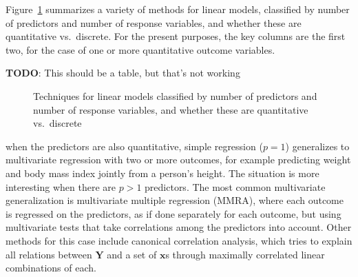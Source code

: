 \documentclass[
  letterpaper,
  10pt,
  krantz2]{krantz}
\begin{document}
{Figure~\ref{fig-techniques} summarizes a variety of methods for linear
models, classified by number of predictors and number of response
variables, and whether these are quantitative vs.~discrete. For the
present purposes, the key columns are the first two, for the case of one
or more quantitative outcome variables.

\textbf{TODO}: This should be a table, but that's not working

\begin{figure}


\caption{\label{fig-techniques}Techniques for linear models classified
by number of predictors and number of response variables, and whether
these are quantitative vs.~discrete}

\end{figure}%

when the predictors are also quantitative, simple regression (\(p=1\))
generalizes to multivariate regression with two or more outcomes, for
example predicting weight and body mass index jointly from a person's
height. The situation is more interesting when there are \(p>1\)
predictors. The most common multivariate generalization is multivariate
multiple regression (MMRA), where each outcome is regressed on the
predictors, as if done separately for each outcome, but using
multivariate tests that take correlations among the predictors into
account. Other methods for this case include canonical correlation
analysis, which tries to explain all relations between \(\mathbf{Y}\)
and a set of \(\mathbf{x}\)s through maximally correlated linear
combinations of each.

}
\end{document}
